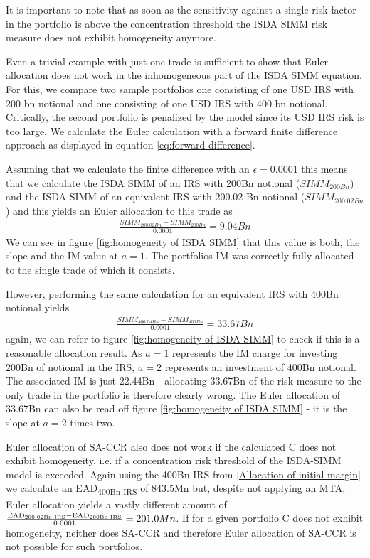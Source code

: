 \documentclass[../Thesis_AHoecherl.tex]{subfiles}
\begin{document}
    It is important to note that as soon as the sensitivity against a single risk factor in the portfolio is above the concentration threshold the ISDA SIMM risk measure does not exhibit homogeneity anymore.

    Even a trivial example with just one trade is sufficient to show that Euler allocation does not work in the inhomogeneous part of the ISDA SIMM equation.
    For this, we compare two sample portfolios one consisting of one USD IRS with 200 bn notional and one consisting of one USD IRS with 400 bn notional.
    Critically, the second portfolio is penalized by the model since its USD IRS risk is too large. We calculate the Euler calculation with a forward finite difference approach as displayed in equation \ref{eq:forward difference}.

    Assuming that we calculate the finite difference with an $\epsilon = 0.0001$ this means that we calculate the ISDA SIMM of an IRS with 200Bn notional ($SIMM_{200Bn}$) and the ISDA SIMM of an equivalent IRS with 200.02 Bn notional ($SIMM_{200.02Bn}$) and this yields an Euler allocation to this trade as
    \begin{align*}
        \frac{SIMM_{200.02Bn} - SIMM_{200Bn}}{0.0001} = 9.04Bn
    \end{align*}
    We can see in figure \ref{fig:homogeneity of ISDA SIMM} that this value is both, the slope and the IM value at $a = 1$. The portfolios IM was correctly fully allocated to the single trade of which it consists. 
    
    However, performing the same calculation for an equivalent IRS with 400Bn notional yields
    \begin{align*}
        \frac{SIMM_{400.04Bn} - SIMM_{400Bn}}{0.0001} = 33.67Bn
    \end{align*}
    again, we can refer to figure \ref{fig:homogeneity of ISDA SIMM} to check if this is a reasonable allocation result. As $a=1$ represents the IM charge for investing 200Bn of notional in the IRS, $a=2$ represents an investment of 400Bn notional. The associated IM is just 22.44Bn - allocating 33.67Bn of the risk measure to the only trade in the portfolio is therefore clearly wrong. The Euler allocation of 33.67Bn can also be read off figure \ref{fig:homogeneity of ISDA SIMM} - it is the slope at $a=2$ times two.

    Euler allocation of SA-CCR also does not work if the calculated C does not exhibit homogeneity, i.e. if a concentration risk threshold of the ISDA-SIMM model is exceeded. Again using the 400Bn IRS from \ref{Allocation of initial margin} we calculate an EAD\textsubscript{400Bn IRS} of 843.5Mn but, despite not applying an MTA, Euler allocation yields a vastly different amount of $ \frac{\text{EAD\textsubscript{200.02Bn IRS}}-\text{EAD\textsubscript{200Bn IRS}}}{0.0001} = 201.0Mn $. If for a given portfolio C does not exhibit homogeneity, neither does SA-CCR and therefore Euler allocation of SA-CCR is not possible for such portfolios. 
\end{document}
